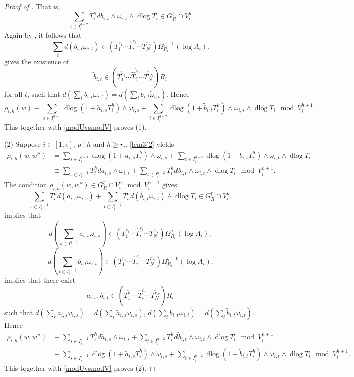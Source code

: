 \documentclass[11pt]{amsart}
\newcommand{\eq}[2]{\begin{equation}\label{#1}#2 \end{equation}}
\newcommand{\dlog}{\operatorname{dlog}}
\renewcommand{\hat}{\widehat}
\newcommand{\ul}{\underline}
\renewcommand{\tilde}{\widetilde}
\theoremstyle{plain}
\theoremstyle{definition}
\numberwithin{equation}{prop}
\begin{document}
\begin{proof}[Proof of ]
That is,
$$\sum_{t\in I_i^{q-2}} T_i^{h}db_{i,t}\wedge\omega_{i,t}\wedge \dlog T_i
\in G_R^{\ul r} \cap V_i^{h}$$
Again by , it follows that
$$\sum_t d(b_{i,t}\omega_{i,t})\in (T_1^{r_1}\cdots\hat T_i^{r_i}\cdots  T_N^{r_N})\Omega^{q-1}_{R_i}(\log A_i).$$
 gives the existence of 
$$\tilde b_{i,t}\in (T_1^{\tilde r_1}\cdots \hat T_i^{\tilde h}\cdots T_N^{\tilde r_N})R_i$$
for all $t$, such that
$d(\sum_t b_{i,t}\omega_{i,t})=d(\sum_t \tilde b_{i,t}\tilde \omega_{i,t}).$
Hence
$$\rho_{i,h}(w)\equiv
\sum_{s\in I_i^{q-1}} \dlog(1+\tilde a_{i,s}T_i^{h})\wedge\tilde\omega_{i,s}
+\sum_{t\in I_i^{q-2}} \dlog(1+\tilde b_{i,t}T_i^{h})\wedge\tilde \omega_{i,s}\wedge \dlog T_i
\mod V_i^{h+1}.
$$
This together with \eqref{modUvsmodV} proves (1).










\vspace{0.5em}
(2)
Suppose $i\in [1,e]$, $p\mid h$ and $h\ge r_i$.    
\eqref{lem3(2} yields
\begin{align*} 
\rho_{i,h}(w,w'')
&=
\sum_{s\in I_i^{q-1}} 
\dlog(1+a_{i,s}T_i^{h})\wedge\omega_{i,s}
+
\sum_{t\in I_i^{q-2}} 
\dlog(1+b_{i,t}T_i^{h})\wedge\omega_{i,t}
\wedge \dlog T_i
\\
&\equiv 
\sum_{s\in I_i^{q-1}} 
T_i^{h}da_{i,s}
\wedge\omega_{i,s}
+
\sum_{t\in I_i^{q-2}} 
T_i^{h}db_{i,t}\wedge\omega_{i,t}
\wedge \dlog T_i
\mod V_i^{h+1}.
\end{align*}
The condition $\rho_{i,h}(w,w'')\in G_R^{\ul r} \cap V_i^{h}\mod V_i^{h+1}$ gives
$$\sum_{s\in I_i^{q-1}} 
T_i^{h}d(a_{i,s}
\omega_{i,s})
+
\sum_{t\in I_i^{q-2}} 
T_i^{h}d(b_{i,t}\omega_{i,t})
\wedge \dlog T_i
\in G_R^{\ul r} \cap V_i^{h}.$$
 implies that 
\eq{lem4(2)-1}{
d(\sum_{s\in I_i^{q-1}} a_{i,s}\omega_{i,s})\in 
(T_1^{r_1}\cdots\hat T_i^{r_i}\cdots  T_N^{r_N})\Omega^q_{R_i}(\log A_i),
}
\eq{lem4(2)-2}{
d(\sum_{t\in I_i^{q-2}} b_{i,t}\omega_{i,t})
\in (T_1^{r_1}\cdots\hat T_i^{r_i}\cdots T_N^{r_N})\Omega^{q-1}_{R_i}(\log A_i).
}
 implies that there exist
$$\tilde a_{i,s}, \tilde b_{i,t}\in (T_1^{\tilde r_1}\cdots \hat T_i^{\tilde h}\cdots T_N^{\tilde r_N})R_i$$
such that 
$d(\sum_{s} a_{i,s}\omega_{i,s})=d(\sum_{s} \tilde a_{i,s}\tilde \omega_{i,s})$,
$d(\sum_{t} b_{i,t}\omega_{i,t})=d(\sum_{t} \tilde b_{i,t}\tilde \omega_{i,t})$.
Hence
\begin{align*}
\rho_{i,h}(w,w'')
&\equiv 
\sum_{s\in I_i^{q-1}} 
T_i^{h}d \tilde a_{i,s}
\wedge\tilde \omega_{i,s}
+
\sum_{t\in I_i^{q-2}} 
T_i^{h}d\tilde b_{i,t}\wedge\tilde \omega_{i,t}
\wedge \dlog T_i
\mod V_i^{h+1}
\\
&\equiv 
\sum_{s\in I_i^{q-1}} 
\dlog(1+\tilde a_{i,s}T_i^{h})\wedge \tilde \omega_{i,s}
+
\sum_{t\in I_i^{q-2}} 
\dlog(1+\tilde b_{i,t}T_i^{h})\wedge \tilde \omega_{i,t}\wedge\dlog T_i
\mod V_i^{h+1}.
\end{align*}
This together with \eqref{modUvsmodV} proves (2).


\end{proof}
\end{document}
